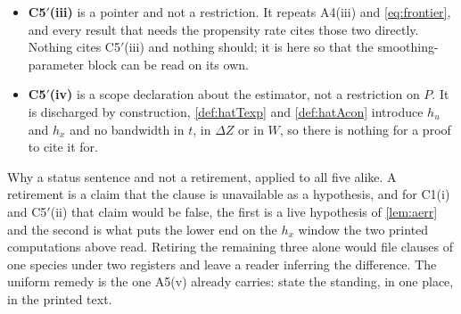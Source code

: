 \begin{itemize}
across the $h_x$ window that C5$'$(ii) and (P-g) leave. Both are computed at the strengthened form of the
clause and at $s=3$, where \eqref{eq:hxwindow} holds with room, so both stand. So C5$'$(ii) is consumed
\emph{arithmetically} and not as a hypothesis, and the two readings must be kept apart: an auditor grepping
hypothesis lists will find nothing, and deleting the clause would nonetheless leave two displays without a
lower limit. \emph{And a lower bound stated more strongly than any proof needs is \textbf{not} free here},
which is the correction \eqref{eq:hxwindow} records: it must intersect the upper bound (P-g) imports, and the
strengthened form and (P-g) have no common solution at any $s\le\tfrac12+18\alpha/(8-3\alpha)$, 
a band that is non-empty at every $\alpha\in(\tfrac14,\approx0.359)$, and \eqref{eq:frontier} forces
$\alpha>\tfrac14$.
\item[--] \textbf{C5$'$(iii)} is a pointer and not a restriction. It repeats A4(iii) and
\eqref{eq:frontier}, and every result that needs the propensity rate cites those two directly. Nothing cites
C5$'$(iii) and nothing should; it is here so that the smoothing-parameter block can be read on its own.
\item[--] \textbf{C5$'$(iv)} is a scope declaration about the estimator, not a restriction on $P$. It is
discharged by construction, \cref{def:hatTexp} and \cref{def:hatAcon} introduce $h_u$ and $h_x$ and no
bandwidth in $t$, in $\Delta Z$ or in $W$, so there is nothing for a proof to cite it for.
\end{itemize}
Why a status sentence and not a retirement, applied to all five alike. A retirement is a claim that the
clause is unavailable as a hypothesis, and for C1(i) and C5$'$(ii) that claim would be false, the first is a
live hypothesis of \cref{lem:aerr} and the second is what puts the lower end on the $h_x$ window the two
printed computations above read. Retiring the remaining three alone would file clauses of one species under two
registers and leave a reader inferring the difference. The uniform remedy is the one A5(v) already
carries: state the standing, in one place, in the printed text.

